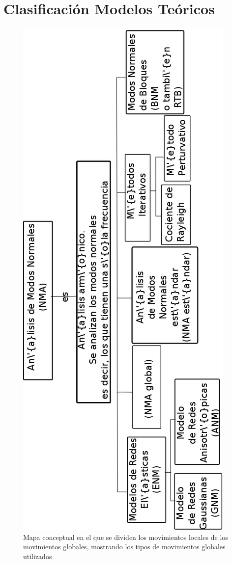 \section{Clasificaci\'{o}n Modelos Te\'{o}ricos}
\begin{figure}
\centering%
%
\includegraphics[scale=0.4]{Kap2/mapa.png}%
\caption{Mapa conceptual en el que se dividen los movimientos locales de los movimientos globales, mostrando los tipos de movimientos globales utilizados} \label{fig:movs}
\end{figure}